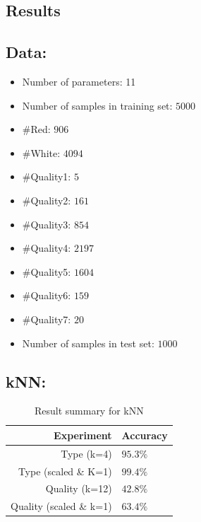 \documentclass[twoside]{article}
\begin{document}
\begin{multicols}{2}

\section{Results}
\subsection*{\textbf{Data:}}
\begin{itemize}
  \item Number of parameters: 11
  \item Number of samples in training set: $5000$
  \item \#Red: $906$
  \item \#White: $4094$
  \item \#Quality1: $5$
  \item \#Quality2: $161$
  \item \#Quality3: $854$
  \item \#Quality4: $2197$
  \item \#Quality5: $1604$
  \item \#Quality6: $159$
  \item \#Quality7: $20$
  \item Number of samples in test set: $1000$
\end{itemize}

\subsection*{\textbf{kNN:}}
\begin{table}[H]
\caption{Result summary for kNN}
\label{summarykNN}
\centering
\begin{tabular}{r|l}
\textbf{Experiment} & \textbf{Accuracy}\\
\midrule
Type (k=4)  & $95.3\%$\\
Type (scaled \& K=1) & $99.4\%$\\
\hline
Quality (k=12) & $42.8\%$\\
Quality (scaled \& k=1) & $63.4\%$\\
\end{tabular}
\end{table}


\end{multicols}
\end{document}
